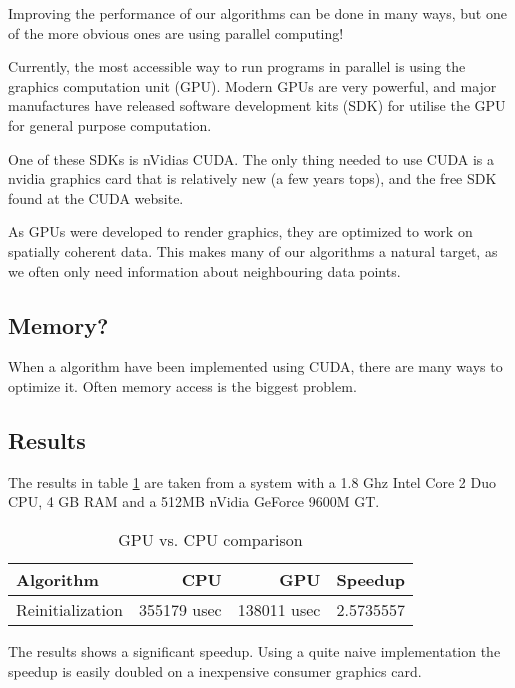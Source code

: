 
Improving the performance of our algorithms can be done in many ways,
but one of the more obvious ones are using parallel computing!

Currently, the most accessible way to run programs in parallel is
using the graphics computation unit (GPU). Modern GPUs are very
powerful, and major manufactures have released software development
kits (SDK) for utilise the GPU for general purpose computation.

One of these SDKs is nVidias CUDA. The only thing needed to
use CUDA is a nvidia graphics card that is relatively new (a few years
tops), and the free SDK found at the CUDA website.

As GPUs were developed to render graphics, they are optimized to work
on spatially coherent data. This makes many of our algorithms a
natural target, as we often only need information about neighbouring
data points.

\subsection{Memory?}

When a algorithm have been implemented using CUDA, there are many ways
to optimize it. Often memory access is the biggest problem.




\subsection{Results}

The results in table \ref{tbl:cudaRes} are taken from a system with a
1.8 Ghz Intel Core 2 Duo CPU, 4 GB RAM and a 512MB nVidia GeForce
9600M GT.

\begin{table}[h]
  \centering
  \begin{tabular}{|l|r|r|r|}
    \hline    Algorithm & CPU & GPU & Speedup \\
\hline
Reinitialization & 355179 usec & 138011 usec & 2.5735557 \\
\hline
  \end{tabular}
  \caption{GPU vs. CPU comparison}
  \label{tbl:cudaRes}
\end{table}

The results shows a significant speedup. Using a quite
naive implementation the speedup is easily doubled on a inexpensive
consumer graphics card.

